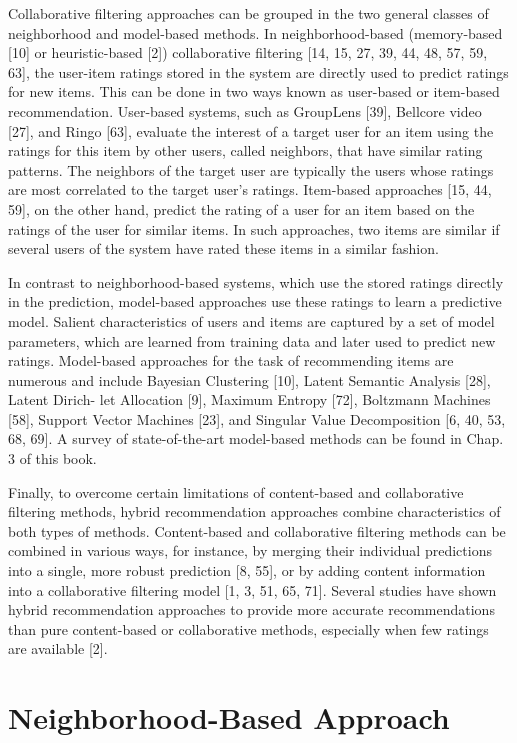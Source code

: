 Collaborative filtering approaches can be grouped in the two general classes of neighborhood and model-based methods. In neighborhood-based (memory-based [10] or heuristic-based [2]) collaborative filtering [14, 15, 27, 39, 44, 48, 57, 59, 63], the user-item ratings stored in the system are directly used to predict ratings for new items. This can be done in two ways known as user-based or item-based recommendation. User-based systems, such as GroupLens [39], Bellcore video [27], and Ringo [63], evaluate the interest of a target user for an item using the ratings for this item by other users, called neighbors, that have similar rating patterns. The neighbors of the target user are typically the users whose ratings are most correlated to the target user’s ratings. Item-based approaches [15, 44, 59], on the other hand, predict the rating of a user for an item based on the ratings of the user for similar items. In such approaches, two items are similar if several users of the system have rated these items in a similar fashion.

In contrast to neighborhood-based systems, which use the stored ratings directly in the prediction, model-based approaches use these ratings to learn a predictive model. Salient characteristics of users and items are captured by a set of model parameters, which are learned from training data and later used to predict new ratings. Model-based approaches for the task of recommending items are numerous and include Bayesian Clustering [10], Latent Semantic Analysis [28], Latent Dirich- let Allocation [9], Maximum Entropy [72], Boltzmann Machines [58], Support Vector Machines [23], and Singular Value Decomposition [6, 40, 53, 68, 69]. A survey of state-of-the-art model-based methods can be found in Chap. 3 of this book.

Finally, to overcome certain limitations of content-based and collaborative filtering methods, hybrid recommendation approaches combine characteristics of both types of methods. Content-based and collaborative filtering methods can be combined in various ways, for instance, by merging their individual predictions into a single, more robust prediction [8, 55], or by adding content information into a collaborative filtering model [1, 3, 51, 65, 71]. Several studies have shown hybrid recommendation approaches to provide more accurate recommendations than pure content-based or collaborative methods, especially when few ratings are available [2].

\section{Neighborhood-Based Approach}

